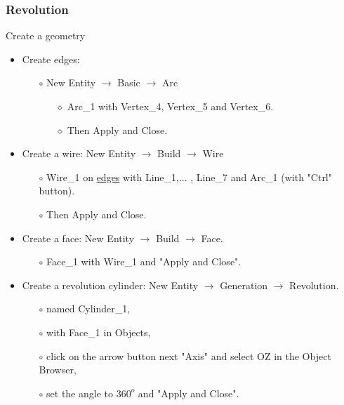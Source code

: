 \documentclass[10pt]{beamer}
\begin{document}
\begin{frame}
\frametitle{Revolution}
\begin{block}{Create a geometry}

\begin{itemize}
\item Create edges:
    \begin{itemize}
    \item [$\circ$] New Entity $\rightarrow$ Basic $\rightarrow$ Arc
        \begin{itemize}
        \item [$\diamond$] Arc\_1 with Vertex\_4, Vertex\_5 and Vertex\_6.
        \item [$\diamond$] Then Apply and Close.
        \end{itemize}
    \end{itemize}

\item Create a wire: New Entity $\rightarrow$ Build $\rightarrow$ Wire
    \begin{itemize}
    \item [$\circ$] Wire\_1 on \underline{edges} with Line\_1,... , Line\_7 and Arc\_1 (with "Ctrl" button).
    \item [$\circ$] Then Apply and Close.
    \end{itemize}

\item Create a face: New Entity $\rightarrow$ Build $\rightarrow$ Face.
    \begin{itemize}
    \item [$\circ$] Face\_1 with Wire\_1 and "Apply and Close".
    \end{itemize}

\item Create a revolution cylinder: New Entity $\rightarrow$ Generation $\rightarrow$ Revolution.
    \begin{itemize}
    \item [$\circ$] named Cylinder\_1,
    \item [$\circ$] with Face\_1 in Objects,
    \item [$\circ$] click on the arrow button next "Axis" and select OZ in the Object Browser,
    \item [$\circ$] set the angle to $360^o$ and "Apply and Close".
    \end{itemize}
\end{itemize}

\end{block}
\end{frame}
\end{document}
